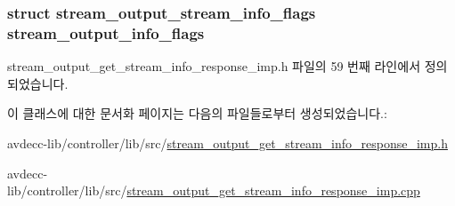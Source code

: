 \subsubsection[{\texorpdfstring{stream\+\_\+output\+\_\+info\+\_\+flags}{stream_output_info_flags}}]{\setlength{\rightskip}{0pt plus 5cm}struct {\bf stream\+\_\+output\+\_\+stream\+\_\+info\+\_\+flags} stream\+\_\+output\+\_\+info\+\_\+flags\hspace{0.3cm}{\ttfamily [private]}}\hypertarget{classavdecc__lib_1_1stream__output__get__stream__info__response__imp_a6d7551cfde27cb9e779880d7f18f50ff}{}\label{classavdecc__lib_1_1stream__output__get__stream__info__response__imp_a6d7551cfde27cb9e779880d7f18f50ff}


stream\+\_\+output\+\_\+get\+\_\+stream\+\_\+info\+\_\+response\+\_\+imp.\+h 파일의 59 번째 라인에서 정의되었습니다.



이 클래스에 대한 문서화 페이지는 다음의 파일들로부터 생성되었습니다.\+:\begin{DoxyCompactItemize}
\item 
avdecc-\/lib/controller/lib/src/\hyperlink{stream__output__get__stream__info__response__imp_8h}{stream\+\_\+output\+\_\+get\+\_\+stream\+\_\+info\+\_\+response\+\_\+imp.\+h}\item 
avdecc-\/lib/controller/lib/src/\hyperlink{stream__output__get__stream__info__response__imp_8cpp}{stream\+\_\+output\+\_\+get\+\_\+stream\+\_\+info\+\_\+response\+\_\+imp.\+cpp}\end{DoxyCompactItemize}
